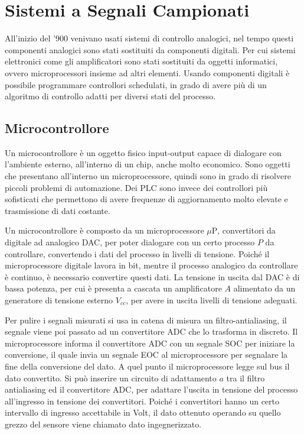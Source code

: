 \documentclass{article}
\numberwithin{equation}{subsection}
\begin{document}
\clearpage

\section{Sistemi a Segnali Campionati}

All'inizio del '900 venivano usati sistemi di controllo analogici, nel tempo questi componenti analogici sono stati sostituiti da componenti digitali. Per cui sistemi elettronici 
come gli amplificatori sono stati sostituiti da oggetti informatici, ovvero microprocessori insieme ad altri elementi. Usando componenti digitali è possibile programmare 
controllori schedulati, in grado di avere più di un algoritmo di controllo adatti per diversi stati del processo.    

\subsection{Microcontrollore}

Un microcontrollore è un oggetto fisico input-output capace di dialogare con l'ambiente esterno, all'interno di un chip, anche molto economico. Sono oggetti che presentano 
all'interno un microprocessore, quindi sono in grado di risolvere piccoli problemi di automazione. Dei PLC sono invece dei controllori più sofisticati che permettono di 
avere frequenze di aggiornamento molto elevate e trasmissione di dati costante. 


Un microcontrollore è composto da un microprocessore $\mu\mathrm{P}$, convertitori da digitale ad analogico DAC, per poter dialogare con un certo processo $P$ da controllare, 
convertendo i dati del processo in livelli di tensione. Poiché il microprocessore digitale lavora in bit, mentre il processo analogico da controllare è continuo, è 
necessario convertire questi dati. La tensione in uscita dal DAC è di bassa potenza, per cui è presenta a cascata un amplificatore $A$ alimentato da un 
generatore di tensione esterno $V_{cc}$, per avere in uscita livelli di tensione adeguati. 


Per pulire i segnali misurati si usa in catena di misura un filtro-antialiasing, il segnale viene poi passato ad un convertitore ADC che lo trasforma in discreto. 
Il microprocessore informa il convertitore 
ADC con un segnale SOC per iniziare la conversione, il quale invia un segnale EOC al microprocessore per segnalare la fine della conversione del dato. A quel punto 
il microprocessore legge sul bus il dato convertito. Si può inserire un circuito di adattamento $a$ tra il filtro antialiasing ed il convertitore ADC, per adattare 
l'uscita in tensione del processo all'ingresso in tensione dei convertitori. Poiché i convertitori hanno un certo intervallo di ingresso accettabile in Volt, il dato 
ottenuto operando su quello grezzo del sensore viene chiamato dato ingegnerizzato. 
\end{document}
